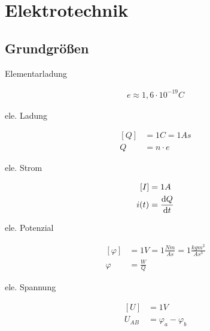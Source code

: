 \chapter{Elektrotechnik}
\section{Grundgrößen}

\begin{boxleft}Elementarladung
\end{boxleft}\begin{boxrightshaded}
\begin{align}
e\approx 1,6\cdot 10^{-19}C
\end{align}
\end{boxrightshaded}

\begin{boxleft}ele. Ladung
\end{boxleft}\begin{boxrightshaded}
\begin{align}
\left[Q\right]&=1C=1As\\
Q&=n\cdot e
\end{align}
\end{boxrightshaded}

\begin{boxleft}ele. Strom
\end{boxleft}\begin{boxrightshaded}
\begin{align}
\left[I\right]&=1A\\
i(t)&=\frac{\mathop{}\!\mathrm{d} Q}{\mathop{}\!\mathrm{d} t}
\end{align}
\end{boxrightshaded}

\begin{boxleft}ele. Potenzial
\end{boxleft}\begin{boxrightshaded}
\begin{align}
\left[\varphi\right]&=1V=1\frac{Nm}{As}=1\frac{kgm^2}{As^3}\\
\varphi&=\frac{W}{Q}
\end{align}
\end{boxrightshaded}

\begin{boxleft}ele. Spannung
\end{boxleft}\begin{boxrightshaded}
\begin{align}
\left[U\right]&=1V\\
U_{AB}&=\varphi_a-\varphi_b
\end{align}
\end{boxrightshaded}

